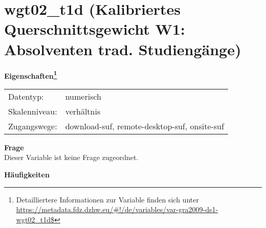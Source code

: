 
    \setcounter{footnote}{0}

    \vspace*{-1.8cm}
	\section{wgt02\_t1d (Kalibriertes Querschnittsgewicht W1: Absolventen trad. Studiengänge)}
	\label{section:wgt02_t1d}



    \vspace*{0.5cm}
    \noindent\textbf{Eigenschaften\footnote{Detailliertere Informationen zur Variable finden sich unter
		\url{https://metadata.fdz.dzhw.eu/\#!/de/variables/var-gra2009-ds1-wgt02_t1d$}}}\\
	\begin{tabularx}{\hsize}{@{}lX}
	Datentyp: & numerisch \\
	Skalenniveau: & verhältnis \\
	Zugangswege: &
	  download-suf, 
	  remote-desktop-suf, 
	  onsite-suf
 \\
    \end{tabularx}



		\vspace*{0.5cm}
		\noindent\textbf{Frage}\\
		Dieser Variable ist keine Frage zugeordnet.





        		\vspace*{0.5cm}
                \noindent\textbf{Häufigkeiten}

